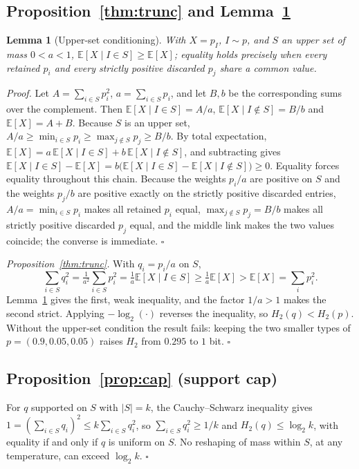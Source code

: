 \documentclass[10pt]{article}
\theoremstyle{plain}
\newtheorem{lemma}{Lemma}
\theoremstyle{definition}
\newcommand{\E}{\mathbb{E}}
\newcommand{\Htwo}{H_2}
\begin{document}
\subsection{Proposition~\ref{thm:trunc} and Lemma~\ref{lem:upperset}}
\begin{lemma}[Upper-set conditioning]
\label{lem:upperset}
With $X=p_I$, $I\sim p$, and $S$ an upper set of mass $0<a<1$, $\E[X\mid I\in S]\ge\E[X]$; equality holds precisely when every retained $p_i$ and every strictly positive discarded $p_j$ share a common value.
\end{lemma}
\emph{Proof.} Let $A=\sum_{i\in S}p_i^2$, $a=\sum_{i\in S}p_i$, and let $B,b$ be the corresponding sums over the complement. Then $\E[X\mid I\in S]=A/a$, $\E[X\mid I\notin S]=B/b$ and $\E[X]=A+B$. Because $S$ is an upper set, $A/a\ge\min_{i\in S}p_i\ge\max_{j\notin S}p_j\ge B/b$. By total expectation, $\E[X]=a\,\E[X\mid I\in S]+b\,\E[X\mid I\notin S]$, and subtracting gives $\E[X\mid I\in S]-\E[X]=b\big(\E[X\mid I\in S]-\E[X\mid I\notin S]\big)\ge0$. Equality forces equality
throughout this chain. Because the weights $p_i/a$ are positive on $S$ and the weights $p_j/b$ are positive
exactly on the strictly positive discarded entries, $A/a=\min_{i\in S}p_i$ makes all retained $p_i$ equal,
$\max_{j\notin S}p_j=B/b$ makes all strictly positive discarded $p_j$ equal, and the middle link makes the two
values coincide; the converse is immediate. $\square$

\emph{Proposition~\ref{thm:trunc}.} With $q_i=p_i/a$ on $S$,
\[
\sum_{i\in S}q_i^2=\tfrac{1}{a^2}\sum_{i\in S}p_i^2=\tfrac1a\E[X\mid I\in S]\ge\tfrac1a\E[X]>\E[X]=\sum_i p_i^2.
\]
Lemma~\ref{lem:upperset} gives the first, weak inequality, and the factor $1/a>1$ makes the second strict. Applying $-\log_2(\cdot)$ reverses the inequality, so $\Htwo(q)<\Htwo(p)$. Without the upper-set condition the result fails: keeping the two smaller types of $p=(0.9,0.05,0.05)$ raises $\Htwo$ from $0.295$ to $1$ bit. $\square$

\subsection{Proposition~\ref{prop:cap} (support cap)}
For $q$ supported on $S$ with $|S|=k$, the Cauchy--Schwarz inequality gives $1=(\sum_{i\in S}q_i)^2\le k\sum_{i\in S}q_i^2$, so $\sum_{i\in S}q_i^2\ge1/k$ and $\Htwo(q)\le\log_2 k$, with equality if and only if $q$ is uniform on $S$. No reshaping of mass within $S$, at any temperature, can exceed $\log_2 k$. $\square$
\end{document}
